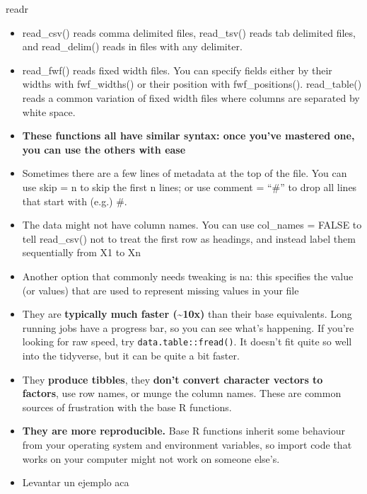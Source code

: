 \documentclass[ignorenonframetext,]{beamer}
\begin{document}
\begin{frame}[fragile]{readr}
\protect\hypertarget{readr}{}


\begin{itemize}
\item
  read\_csv() reads comma delimited files, read\_tsv() reads tab
  delimited files, and read\_delim() reads in files with any delimiter.
\item
  read\_fwf() reads fixed width files. You can specify fields either by
  their widths with fwf\_widths() or their position with
  fwf\_positions(). read\_table() reads a common variation of fixed
  width files where columns are separated by white space.
\item
  \textbf{These functions all have similar syntax: once you've mastered
  one, you can use the others with ease}
\item
  Sometimes there are a few lines of metadata at the top of the file.
  You can use skip = n to skip the first n lines; or use comment =
  ``\#'' to drop all lines that start with (e.g.) \#.
\item
  The data might not have column names. You can use col\_names = FALSE
  to tell read\_csv() not to treat the first row as headings, and
  instead label them sequentially from X1 to Xn
\item
  Another option that commonly needs tweaking is na: this specifies the
  value (or values) that are used to represent missing values in your
  file
\item
  They are \textbf{typically much faster (\textasciitilde{}10x)} than
  their base equivalents. Long running jobs have a progress bar, so you
  can see what's happening. If you're looking for raw speed, try
  \texttt{data.table::fread()}. It doesn't fit quite so well into the
  tidyverse, but it can be quite a bit faster.
\item
  They \textbf{produce tibbles}, they \textbf{don't convert character
  vectors to factors}, use row names, or munge the column names. These
  are common sources of frustration with the base R functions.
\item
  \textbf{They are more reproducible.} Base R functions inherit some
  behaviour from your operating system and environment variables, so
  import code that works on your computer might not work on someone
  else's.
\item
  Levantar un ejemplo aca
\end{itemize}

\end{frame}
\end{document}
